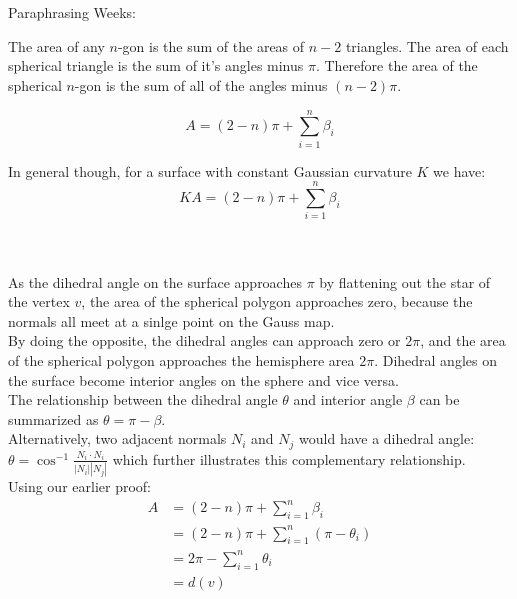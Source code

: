 \documentclass{article}
\newcommand\ifrac[2]{{\displaystyle\frac{#1}{#2}}}
\begin{document}
\vspace{1.8cm}
\\\\

Paraphrasing Weeks:\\
\begin{mdframed}
    The area of any $n$-gon is the sum of the areas of $n-2$ triangles.
    The area of each spherical triangle is the sum of it's angles minus $\pi$.
    Therefore the area of the spherical $n$-gon is the sum of all of the angles minus $(n-2)\pi$.
\end{mdframed}

$$
    A = (2 - n)\pi + \sum_{i=1}^n \beta_i
$$

In general though, for a surface with constant Gaussian curvature $K$ we have:
$$
    KA = (2 - n)\pi + \sum_{i=1}^n \beta_i
$$


\vspace{1.8cm}
\\\\

As the dihedral angle on the surface approaches $\pi$ by flattening out the star of the vertex $v$,
the area of the spherical polygon approaches zero, because the normals all meet at a sinlge point on the Gauss map.\\
By doing the opposite, the dihedral angles can approach zero or $2\pi$, and the area of the spherical polygon approaches the hemisphere area $2\pi$.
Dihedral angles on the surface become interior angles on the sphere and vice versa.\\
The relationship between the dihedral angle $\theta$ and interior angle $\beta$ can be summarized as $\theta = \pi - \beta$.\\

Alternatively, two adjacent normals $N_i$ and $N_j$ would have a dihedral angle: $\theta = \cos^{-1} \ifrac{N_i \cdot N_i}{|N_i||N_j|}$
which further illustrates this complementary relationship.\\

Using our earlier proof:
\begin{align*}
    A   &= (2 - n)\pi + \sum_{i=1}^n \beta_i \\
        &= (2 - n)\pi + \sum_{i=1}^n (\pi - \theta_i) \\
        &= 2\pi - \sum_{i=1}^n \theta_i \\
        &= d(v)
\end{align*}
\end{document}
